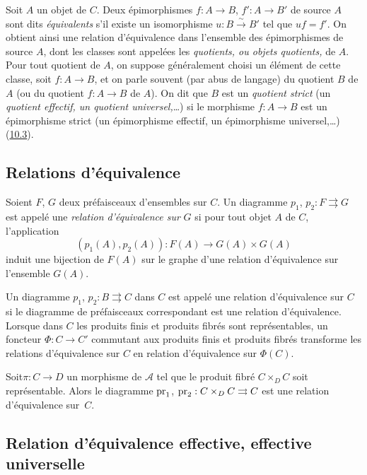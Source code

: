 \documentclass[10pt]{../fichiers-configuration-latex/smfart}
\begin{document}
\etc\pageoriginale

Soit $A$ un objet de $C$. Deux épimorphismes $f:A\rightarrow B$,
$f':A\rightarrow B'$ de source $A$ sont dits \emph{équivalents} s'il
existe un isomorphisme $u:B\xrightarrow{\sim}B'$ tel que $uf=f'$. On
obtient ainsi une relation d'équivalence dans l'ensemble des
épimorphismes de source $A$, dont les classes sont appelées les
\emph{quotients, ou objets quotients,} de $A$. Pour tout quotient de
$A$, on suppose généralement choisi un élément de cette classe, soit
$f:A\rightarrow B$, et on parle souvent (par abus de langage) du
quotient $B$ de $A$ (ou du quotient $f:A\rightarrow B$ de $A$). On
dit que $B$ est un \emph{quotient strict} (\resp un \emph{quotient
effectif, \resp un quotient universel,}\ldots) si le morphisme
$f:A\rightarrow B$ est un épimorphisme strict (\resp un épimorphisme
effectif, \resp un épimorphisme universel,\ldots) (\hyperref[I.sec10.3]{10.3}).

\subsection{Relations d'équivalence}

Soient $F$, $G$ deux préfaisceaux d'ensembles sur $C$. Un diagramme
$p_1$, $p_2:F\rightrightarrows G$ est appelé une \emph{relation
d'équivalence sur} $G$ si pour tout objet $A$ de $C$, l'application
$$
(p_1(A),p_2(A)):F(A)\longrightarrow G(A)\times G(A)
$$
induit une bijection de $F(A)$ sur le graphe d'une relation
d'équivalence sur l'ensemble $G(A)$.

Un diagramme $p_1$, $p_2:B\rightrightarrows C$ dans $C$ est appelé
une relation d'équivalence sur $C$ si le diagramme de préfaisceaux
correspondant est une relation d'équivalence. Lorsque dans $C$ les
produits finis et produits fibrés sont représentables, un foncteur
$\Phi:C\rightarrow C'$ commutant aux produits finis et produits
fibrés transforme les relations d'équivalence sur $C$ en relation
d'équivalence sur $\Phi (C)$.

Soit\pageoriginale $\pi:C\rightarrow D$ un morphisme de $𝒜$
tel que le produit fibré $C\times_D C$ soit représentable. Alors le
diagramme $\operatorname{pr}_1$, $\operatorname{pr}_2:C\times_D C\rightrightarrows C$ est une
relation d'équivalence sur~$C$.

\subsection{Relation d'équivalence effective, effective universelle}
\end{document}
